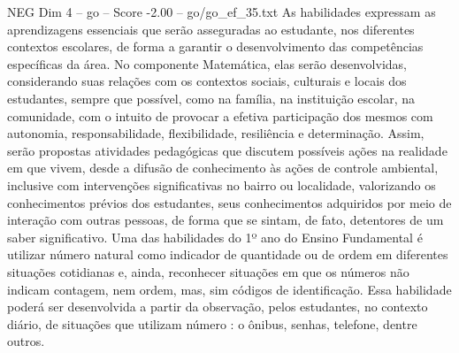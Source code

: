 \begin{textsample}{NEG Dim 4 – go – Score -2.00 – go/go\_ef\_35.txt}
As habilidades expressam as aprendizagens essenciais que serão asseguradas ao estudante, nos diferentes contextos escolares, de forma a garantir o desenvolvimento das competências específicas da área.
No componente Matemática, elas serão desenvolvidas, considerando suas relações com os contextos sociais, culturais e locais dos estudantes, sempre que possível, como na família, na instituição escolar, na comunidade, com o intuito de provocar a efetiva participação dos mesmos com autonomia, responsabilidade, flexibilidade, resiliência e determinação.
Assim, serão propostas atividades pedagógicas que discutem possíveis ações na realidade em que vivem, desde a difusão de conhecimento às ações de controle ambiental, inclusive com intervenções significativas no bairro ou localidade, valorizando os conhecimentos prévios dos estudantes, seus conhecimentos adquiridos por meio de interação com outras pessoas, de forma que se sintam, de fato, detentores de um saber significativo.
Uma das habilidades do 1º ano do Ensino Fundamental é utilizar número natural como indicador de quantidade ou de ordem em diferentes situações cotidianas e, ainda, reconhecer situações em que os números não indicam contagem, nem ordem, mas, sim códigos de identificação.
Essa habilidade poderá ser desenvolvida a partir da observação, pelos estudantes, no contexto diário, de situações que utilizam número : o ônibus, senhas, telefone, dentre outros.

\end{textsample}
